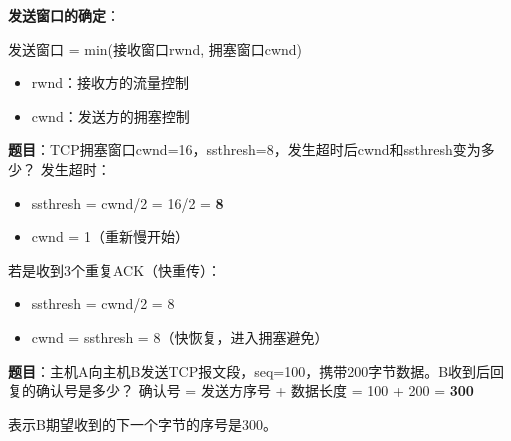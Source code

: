 \begin{center}
\end{center}

\begin{notebox}
\textbf{发送窗口的确定}：

发送窗口 = min(接收窗口rwnd, 拥塞窗口cwnd)

\begin{itemize}[itemsep=0pt]
    \item rwnd：接收方的流量控制
    \item cwnd：发送方的拥塞控制
\end{itemize}
\end{notebox}

\begin{examplebox}[例题5.3 拥塞控制]
\textbf{题目}：TCP拥塞窗口cwnd=16，ssthresh=8，发生超时后cwnd和ssthresh变为多少？
\tcblower
发生超时：
\begin{itemize}[itemsep=0pt]
    \item ssthresh = cwnd/2 = 16/2 = \textbf{8}
    \item cwnd = 1（重新慢开始）
\end{itemize}

若是收到3个重复ACK（快重传）：
\begin{itemize}[itemsep=0pt]
    \item ssthresh = cwnd/2 = 8
    \item cwnd = ssthresh = 8（快恢复，进入拥塞避免）
\end{itemize}
\end{examplebox}

\begin{examplebox}[例题5.4 TCP综合计算]
\textbf{题目}：主机A向主机B发送TCP报文段，seq=100，携带200字节数据。B收到后回复的确认号是多少？
\tcblower
确认号 = 发送方序号 + 数据长度 = 100 + 200 = \textbf{300}

表示B期望收到的下一个字节的序号是300。
\end{examplebox}

